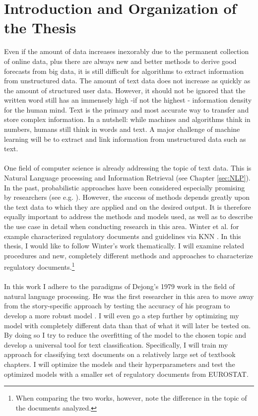 \documentclass[11pt,a4paper]{article}
\author{Sebastian Knigge}
\begin{document}
	
\tableofcontents
	
\section{Introduction and Organization of the Thesis}
	
Even if the amount of data increases inexorably due to the permanent collection of online data, plus there are always new and better methods to derive good forecasts from big data, it is still difficult for algorithms to extract information from unstructured data. The amount of text data does not increase as quickly as the amount of structured user data. However, it should not be ignored that the written word still has an immensely high -if not the highest - information density for the human mind. Text is the primary and most accurate way to transfer and store complex information. In a nutshell: while machines and algorithms think in numbers, humans still think in words and text. A major challenge of machine learning will be to extract and link information from unstructured data such as text.\\
\ \\
One field of computer science is already addressing the topic of text data. This is Natural Language processing and Information Retrieval (see Chapter \ref{sec:NLP}). In the past, probabilistic approaches have been considered especially promising by researchers (see e.g. \cite{Manning1999}). However, the success of methods depends greatly upon the text data to which they are applied and on the desired output. It is therefore equally important to address the methods and models used, as well as to describe the use case in detail when conducting research in this area. Winter et al. for example characterized regulatory documents and guidelines via KNN \cite{Winter2017}. In this thesis, I would like to follow Winter's work thematically. I will examine related procedures and new, completely different methods and approaches to characterize regulatory documents.\footnote{When comparing the two works, however, note the difference in the topic of the documents analyzed.}\\
\ \\
In this work I adhere to the paradigms of Dejong's 1979 work in the field of natural language processing. He was the first researcher in this area to move away from the story-specific approach by testing the accuracy of his program to develop a more robust model \cite{DeJong1979}. I will even go a step further by optimizing my model with completely different data than that of what it will later be tested on. By doing so I try to reduce the overfitting of the model to the chosen topic and develop a universal tool for text classification. Specifically, I will train my approach for classifying text documents on a relatively large set of textbook chapters. I will optimize the models and their hyperparameters and test the optimized models with a smaller set of regulatory documents from EUROSTAT.\\
\end{document}
